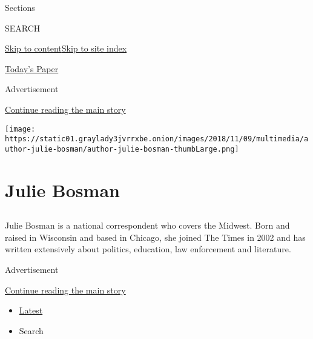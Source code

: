 Sections

SEARCH

\protect\hyperlink{site-content}{Skip to
content}\protect\hyperlink{site-index}{Skip to site index}

\href{https://myaccount.nytimes3xbfgragh.onion/auth/login?response_type=cookie\&client_id=vi}{}

\href{https://www.nytimes3xbfgragh.onion/section/todayspaper}{Today's
Paper}

Advertisement

\protect\hyperlink{after-top}{Continue reading the main story}

\texttt{[image: https://static01.graylady3jvrrxbe.onion/images/2018/11/09/multimedia/author-julie-bosman/author-julie-bosman-thumbLarge.png]}

\hypertarget{julie-bosman}{%
\section{Julie Bosman}\label{julie-bosman}}

\subsection{}

Julie Bosman is a national correspondent who covers the Midwest. Born
and raised in Wisconsin and based in Chicago, she joined The Times in
2002 and has written extensively about politics, education, law
enforcement and literature.

Advertisement

\protect\hyperlink{after-mid1}{Continue reading the main story}

\begin{itemize}
\tightlist
\item
  \protect\hyperlink{stream-panel}{Latest}
\item
  Search
\end{itemize}

